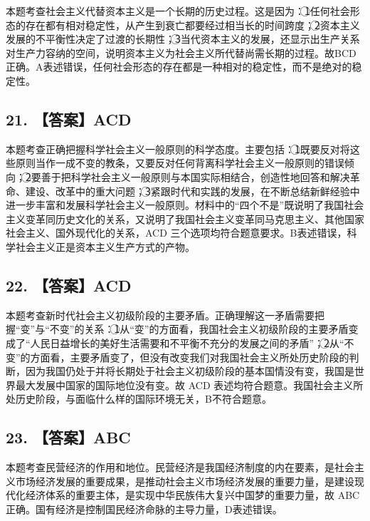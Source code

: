 \documentclass[UTF8,11pt]{ctexart}
\begin{document}
本题考查社会主义代替资本主义是一个长期的历史过程。这是因为：\textcircled{1}任何社会形态的存在都有相对稳定性，从产生到衰亡都要经过相当长的时间跨度；\textcircled{2}资本主义发展的不平衡性决定了过渡的长期性；\textcircled{3}当代资本主义的发展，还显示出生产关系对生产力容纳的空间，说明资本主义为社会主义所代替尚需长期的过程。故BCD正确。A表述错误，任何社会形态的存在都是一种相对的稳定性，而不是绝对的稳定性。


\subsection*{21. 【答案】ACD}

本题考查正确把握科学社会主义一般原则的科学态度。主要包括：\textcircled{1}既要反对将这些原则当作一成不变的教条，又要反对任何背离科学社会主义一般原则的错误倾向；\textcircled{2}要善于把科学社会主义一般原则与本国实际相结合，创造性地回答和解决革命、建设、改革中的重大问题；\textcircled{3}紧跟时代和实践的发展，在不断总结新鲜经验中进一步丰富和发展科学社会主义一般原则。材料中的“四个不是”既说明了我国社会主义变革同历史文化的关系，又说明了我国社会主义变革同马克思主义、其他国家社会主义、国外现代化的关系，ACD 三个选项均符合题意要求。B表述错误，科学社会主义正是资本主义生产方式的产物。


\subsection*{22. 【答案】ACD}

本题考查新时代社会主义初级阶段的主要矛盾。正确理解这一矛盾需要把握“变”与“不变”的关系：\textcircled{1}从“变”的方面看，我国社会主义初级阶段的主要矛盾变成了“人民日益增长的美好生活需要和不平衡不充分的发展之间的矛盾”；\textcircled{2}从“不变”的方面看，主要矛盾变了，但没有改变我们对我国社会主义所处历史阶段的判断，因为我国仍处于并将长期处于社会主义初级阶段的基本国情没有变，我国是世界最大发展中国家的国际地位没有变。故 ACD 表述均符合题意。我国社会主义所处历史阶段，与面临什么样的国际环境无关，B不符合题意。


\subsection*{23. 【答案】ABC}

本题考查民营经济的作用和地位。民营经济是我国经济制度的内在要素，是社会主义市场经济发展的重要成果，是推动社会主义市场经济发展的重要力量，是建设现代化经济体系的重要主体，是实现中华民族伟大复兴中国梦的重要力量，故 ABC 正确。国有经济是控制国民经济命脉的主导力量，D表述错误。
\end{document}
